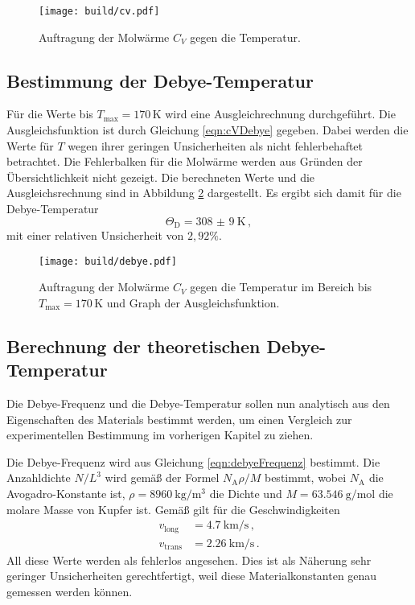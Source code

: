 \begin{figure}
  \centering
  \texttt{[image: build/cv.pdf]}
  \caption{Auftragung der Molwärme $C_V$ gegen die Temperatur.}
  \label{fig:cv}
\end{figure}

\subsection{Bestimmung der Debye-Temperatur}
\label{subsec:debye}

Für die Werte bis $T_{\text{max}}=170$\,K wird eine Ausgleichrechnung durchgeführt. Die Ausgleichsfunktion ist durch Gleichung \eqref{eqn:cVDebye} gegeben.
Dabei werden die Werte für $T$ wegen ihrer geringen Unsicherheiten als nicht fehlerbehaftet betrachtet.
Die Fehlerbalken für die Molwärme werden aus Gründen der Übersichtlichkeit nicht gezeigt.
Die berechneten Werte und die Ausgleichsrechnung sind in Abbildung \ref{fig:debye} dargestellt.
Es ergibt sich damit für die Debye-Temperatur
\begin{equation*}
  \Theta_\text{D}=\SI{308(9)}{\kelvin} \,,
\end{equation*}
mit einer relativen Unsicherheit von $2{,}92\%$.

\begin{figure}
  \centering
  \texttt{[image: build/debye.pdf]}
  \caption{Auftragung der Molwärme $C_V$ gegen die Temperatur im Bereich bis
  $T_{\text{max}}=170$\,K und Graph der Ausgleichsfunktion.}
  \label{fig:debye}
\end{figure}

\subsection{Berechnung der theoretischen Debye-Temperatur}
\label{subsec:debyetheo}

Die Debye-Frequenz und die Debye-Temperatur sollen nun analytisch aus den Eigenschaften des Materials bestimmt werden, um einen Vergleich zur experimentellen Bestimmung im vorherigen Kapitel zu ziehen.

Die Debye-Frequenz wird aus Gleichung \eqref{eqn:debyeFrequenz} bestimmt.
Die Anzahldichte $N/L^3$ wird gemäß der Formel $N_\text{A} \rho / M$ bestimmt, wobei $N_\text{A}$ die Avogadro-Konstante ist,
$\rho = \SI{8960}{\kilo\gram\per\cubic\meter}$ \cite{density} die Dichte und $M = \SI{63.546}{\gram\per\mole}$ \cite{Molmasse} die molare Masse von Kupfer ist.
Gemäß \cite{versuchsanleitung} gilt für die Geschwindigkeiten
\begin{align*}
  v_{\text{long}}&= \SI{4.7}{\kilo\metre\per\second} \,,\\
  v_{\text{trans}}&=\SI{2.26}{\kilo\metre\per\second} \,.
\end{align*}
All diese Werte werden als fehlerlos angesehen. Dies ist als Näherung sehr geringer Unsicherheiten gerechtfertigt, weil diese Materialkonstanten genau gemessen werden können.


